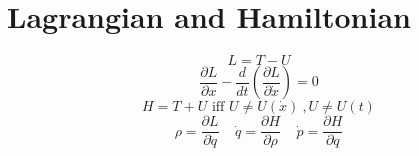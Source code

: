 \documentclass[10pt,letter]{article}
\begin{document}
\section{Lagrangian and Hamiltonian} %
\label{sec:lagrangian_and_hamiltonian}
\begin{equation}
    L = T - U
\end{equation}
\begin{equation}
    \frac{\partial L}{\partial x} - \frac{d}{dt} \left( \frac{\partial L}{\partial \dot{x}} \right) = 0
\end{equation}
\begin{equation}
    H = T + U \textrm{ iff }U \neq U(\dot{x})~, U \neq U(t)
\end{equation}
\begin{equation}
    \rho = \frac{\partial L}{\partial \dot{q}}~~~~~\dot{q} = \frac{\partial H}{\partial \rho}~~~~~ \dot{p} = \frac{\partial H}{\partial q}
\end{equation}
\end{document}
